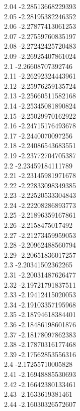 {2.04	-2.28513668229393\\
2.05	-2.28195382246352\\
2.06	-2.27877413061253\\
2.07	-2.27559760835197\\
2.08	-2.27242425720483\\
2.09	-2.26925407861024\\
2.1	-2.26608707392746\\
2.11	-2.26292324443961\\
2.12	-2.25976259135724\\
2.13	-2.25660511582168\\
2.14	-2.25345081890824\\
2.15	-2.25029970162922\\
2.16	-2.24715176493678\\
2.17	-2.2440070097256\\
2.18	-2.24086543683551\\
2.19	-2.23772704705387\\
2.2	-2.23459184111789\\
2.21	-2.23145981971678\\
2.22	-2.22833098349385\\
2.23	-2.22520533304843\\
2.24	-2.22208286893773\\
2.25	-2.21896359167861\\
2.26	-2.2158475017492\\
2.27	-2.21273459959053\\
2.28	-2.20962488560794\\
2.29	-2.20651836017257\\
2.3	-2.20341502362265\\
2.31	-2.20031487626477\\
2.32	-2.19721791837511\\
2.33	-2.19412415020053\\
2.34	-2.19103357195968\\
2.35	-2.18794618384401\\
2.36	-2.18486198601876\\
2.37	-2.18178097862383\\
2.38	-2.17870316177468\\
2.39	-2.17562853556316\\
2.4	-2.17255710005828\\
2.41	-2.16948885530693\\
2.42	-2.16642380133461\\
2.43	-2.1633619381461\\
2.44	-2.16030326572607\\
}

